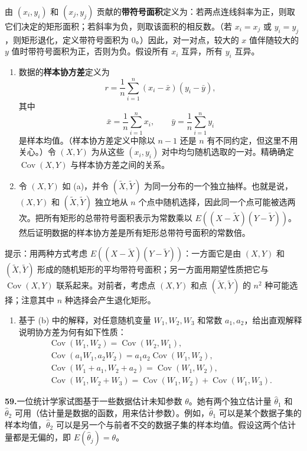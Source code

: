 \documentclass[UTF8, 12pt, fontset=fandol, oneside]{ctexart}
\begin{document}
由 $(x_i,y_i)$ 和 $(x_j,y_j)$ 贡献的\textbf{带符号面积}定义为：若两点连线斜率为正，则取它们决定的矩形面积；若斜率为负，则取该面积的相反数。（若 $x_i=x_j$ 或 $y_i=y_j$，则矩形退化，定义带符号面积为 $0$。）因此，对一对点，较大的 $x$ 值伴随较大的 $y$ 值时带符号面积为正，否则为负。假设所有 $x_i$ 互异，所有 $y_i$ 互异。
\begin{enumerate}
  \item[(a)] 数据的\textbf{样本协方差}定义为
  \[
    r=\frac1n\sum_{i=1}^{n}(x_i-\bar x)(y_i-\bar y),
  \]
  其中
  \[
    \bar x=\frac1n\sum_{i=1}^{n}x_i,\qquad
    \bar y=\frac1n\sum_{i=1}^{n}y_i
  \]
  是样本均值。（样本协方差定义中除以 $n-1$ 还是 $n$ 有不同约定，但这里不用关心。）令 $(X,Y)$ 为从这些 $(x_i,y_i)$ 对中均匀随机选取的一对。精确确定 $\operatorname{Cov}(X,Y)$ 与样本协方差之间的关系。
  \item[(b)] 令 $(X,Y)$ 如 (a)，并令 $(\tilde X,\tilde Y)$ 为同一分布的一个独立抽样。也就是说，$(X,Y)$ 和 $(\tilde X,\tilde Y)$ 独立地从 $n$ 个点中随机选择，因此同一个点可能被选两次。把所有矩形的总带符号面积表示为常数乘以 $E((X-\tilde X)(Y-\tilde Y))$。然后证明数据的样本协方差是所有矩形总带符号面积的常数倍。
\end{enumerate}
提示：用两种方式考虑 $E((X-\tilde X)(Y-\tilde Y))$：一方面它是由 $(X,Y)$ 和 $(\tilde X,\tilde Y)$ 形成的随机矩形的平均带符号面积；另一方面用期望性质把它与 $\operatorname{Cov}(X,Y)$ 联系起来。对前者，考虑点 $(X,Y)$ 和点 $(\tilde X,\tilde Y)$ 的 $n^2$ 种可能选择；注意其中 $n$ 种选择会产生退化矩形。
\begin{enumerate}
  \item[(c)] 基于 (b) 中的解释，对任意随机变量 $W_1,W_2,W_3$ 和常数 $a_1,a_2$，给出直观解释说明协方差为何有如下性质：
  \[
  \begin{gathered}
    \operatorname{Cov}(W_1,W_2)=\operatorname{Cov}(W_2,W_1),\\
    \operatorname{Cov}(a_1W_1,a_2W_2)=a_1a_2\operatorname{Cov}(W_1,W_2),\\
    \operatorname{Cov}(W_1+a_1,W_2+a_2)=\operatorname{Cov}(W_1,W_2),\\
    \operatorname{Cov}(W_1,W_2+W_3)=\operatorname{Cov}(W_1,W_2)+\operatorname{Cov}(W_1,W_3).
  \end{gathered}
  \]
\end{enumerate}

\noindent\textbf{59.}\quad 一位统计学家试图基于一些数据估计未知参数 $\theta$。她有两个独立估计量 $\hat\theta_1$ 和 $\hat\theta_2$ 可用（估计量是数据的函数，用来估计参数）。例如，$\hat\theta_1$ 可以是某个数据子集的样本均值，$\hat\theta_2$ 可以是另一个与前者不交的数据子集的样本均值。假设这两个估计量都是无偏的，即 $E(\hat\theta_j)=\theta$。
\end{document}
